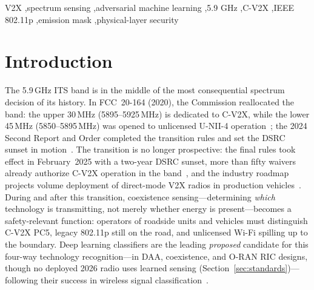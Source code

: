 \documentclass[review]{elsarticle}
\begin{document}
\begin{frontmatter}
\begin{keyword}
V2X \sep spectrum sensing \sep adversarial machine learning \sep 5.9 GHz
\sep C-V2X \sep IEEE 802.11p \sep emission mask \sep physical-layer security
\end{keyword}

\end{frontmatter}

\section{Introduction}
\label{sec:intro}

The 5.9\,GHz ITS band is in the middle of the most consequential spectrum
decision of its history. In FCC~20-164 (2020), the Commission reallocated the
band: the upper 30\,MHz (5895--5925\,MHz) is dedicated to C-V2X, while the
lower 45\,MHz (5850--5895\,MHz) was opened to unlicensed U-NII-4
operation~\cite{fcc2020}; the 2024 Second Report and Order completed the
transition rules and set the DSRC sunset in motion~\cite{fcc2024}. The
transition is no longer prospective: the final rules took effect in
February~2025 with a two-year DSRC sunset, more than fifty waivers already
authorize C-V2X operation in the band~\cite{itsa2024}, and the industry
roadmap projects volume deployment of direct-mode V2X radios in production
vehicles~\cite{5gaa2024}. During and
after this transition, coexistence sensing---determining \emph{which}
technology is transmitting, not merely whether energy is present---becomes a
safety-relevant function: operators of roadside units and vehicles must
distinguish C-V2X
PC5, legacy 802.11p still on the road, and unlicensed Wi-Fi spilling up to the
boundary. Deep learning classifiers are the leading \emph{proposed}
candidate for this
four-way technology recognition---in DAA, coexistence, and O-RAN RIC
designs, though no deployed 2026 radio uses learned sensing
(Section~\ref{sec:standards})---following their success in wireless signal
classification~\cite{o2018,girmay2023}.
\end{document}
